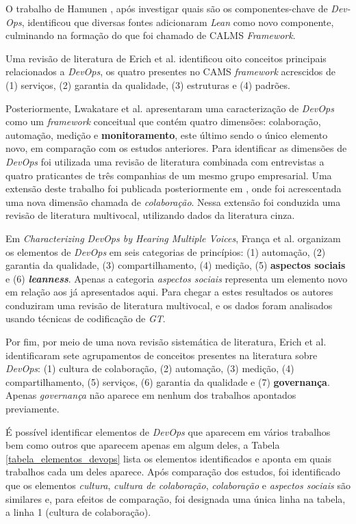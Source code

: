 O trabalho de Hamunen \cite{challenges_in_adopting_devops}, após
investigar quais são os componentes-chave de {\it Dev-Ops}, identificou que
diversas fontes adicionaram {\it Lean} como novo componente, culminando
na formação do que foi chamado de CALMS \textit{Framework}.

Uma revisão de literatura de Erich et al. \cite{cooperation_dev_ops_esem_2014}
identificou oito conceitos principais relacionados a \textit{DevOps}, os quatro
presentes no \acrshort{CAMS} \textit{framework} acrescidos de (1) serviços,
(2) garantia da qualidade, (3) estruturas e (4) padrões.

Posteriormente, Lwakatare et al. \cite{dimensions_of_devops} apresentaram uma
caracterização de \textit{DevOps} como um \textit{framework} conceitual que
contém quatro dimensões: colaboração, automação, medição e
\textbf{monitoramento}, este último sendo o único elemento novo, em comparação
com os estudos anteriores. Para identificar as dimensões de \textit{DevOps} foi
utilizada uma revisão de literatura combinada com entrevistas a quatro
praticantes de três companhias de um mesmo grupo empresarial. Uma extensão
deste trabalho foi publicada posteriormente em \cite{extending_dimensions}, onde
foi acrescentada uma nova dimensão chamada de \emph{colaboração}. Nessa extensão foi
conduzida uma revisão de literatura multivocal, utilizando dados da literatura
cinza.

Em \emph{Characterizing DevOps by Hearing Multiple Voices}, França et al.
\cite{characterizing_devops} organizam os elementos de \textit{DevOps} em seis
categorias de princípios: (1) automação, (2) garantia da qualidade,
(3) compartilhamento, (4) medição, (5) \textbf{aspectos sociais} e (6)
\textbf{\textit{leanness}}. Apenas a categoria \emph{aspectos sociais}
representa um elemento novo em relação aos já apresentados aqui. Para
chegar a estes resultados os autores conduziram uma revisão de literatura
multivocal, e os dados foram analisados usando técnicas de
codificação de \textit{\acrfull{GT}}.

Por fim, por meio de uma nova revisão sistemática de literatura, Erich et al.
\cite{qualitative_devops_journalsw_17} identificaram sete agrupamentos de
conceitos presentes na literatura sobre \textit{DevOps}: (1) cultura de
colaboração, (2) automação, (3) medição, (4) compartilhamento, (5) serviços,
(6) garantia da qualidade e (7) \textbf{governança}. Apenas \emph{governança}
não aparece em nenhum dos trabalhos apontados previamente.

É possível identificar elementos de \textit{DevOps} que aparecem em vários
trabalhos bem como outros que aparecem apenas em algum deles, a Tabela
\ref{tabela_elementos_devops} lista os elementos identificados e aponta em
quais trabalhos cada um deles aparece. Após comparação dos estudos, foi
identificado que os elementos \emph{cultura}, \emph{cultura de colaboração},
\emph{colaboração} e \emph{aspectos sociais} são similares e, para efeitos de
comparação, foi designada uma única linha na tabela, a linha 1 (cultura de
colaboração).

